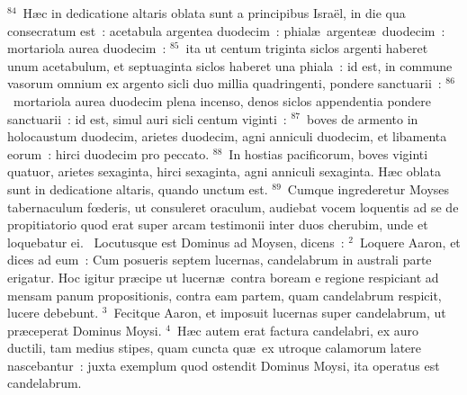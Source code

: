 ${}^{84}$~H\ae c in dedicatione altaris oblata sunt a principibus Isra\"el, in die qua consecratum est~: acetabula argentea duodecim~: phial\ae\ argente\ae\ duodecim~: mortariola aurea duodecim~:
${}^{85}$~ita ut centum triginta siclos argenti haberet unum acetabulum, et septuaginta siclos haberet una phiala~: id est, in commune vasorum omnium ex argento sicli duo millia quadringenti, pondere sanctuarii~:
${}^{86}$~mortariola aurea duodecim plena incenso, denos siclos appendentia pondere sanctuarii~: id est, simul auri sicli centum viginti~:
${}^{87}$~boves de armento in holocaustum duodecim, arietes duodecim, agni anniculi duodecim, et libamenta eorum~: hirci duodecim pro peccato.
${}^{88}$~In hostias pacificorum, boves viginti quatuor, arietes sexaginta, hirci sexaginta, agni anniculi sexaginta. H\ae c oblata sunt in dedicatione altaris, quando unctum est.
${}^{89}$~Cumque ingrederetur Moyses tabernaculum fœderis, ut consuleret oraculum, audiebat vocem loquentis ad se de propitiatorio quod erat super arcam testimonii inter duos cherubim, unde et loquebatur ei.
~\lettrine[lines=10,image=true,loversize=0.05,lraise=-0.03]{L}{}ocutusque est Dominus ad Moysen, dicens~:
${}^{2}$~Loquere Aaron, et dices ad eum~: Cum posueris septem lucernas, candelabrum in australi parte erigatur. Hoc igitur pr\ae cipe ut lucern\ae\ contra boream e regione respiciant ad mensam panum propositionis, contra eam partem, quam candelabrum respicit, lucere debebunt.
${}^{3}$~Fecitque Aaron, et imposuit lucernas super candelabrum, ut pr\ae ceperat Dominus Moysi.
${}^{4}$~H\ae c autem erat factura candelabri, ex auro ductili, tam medius stipes, quam cuncta qu\ae\ ex utroque calamorum latere nascebantur~: juxta exemplum quod ostendit Dominus Moysi, ita operatus est candelabrum.


